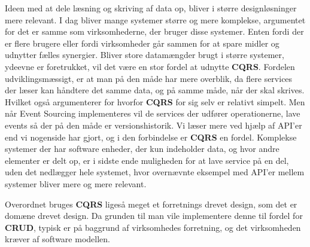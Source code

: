 Ideen med at dele læsning og skriving af data op, bliver i større designløsninger mere relevant. 
I dag bliver mange systemer større og mere komplekse, argumentet for det er samme som virksomhederne, der bruger disse systemer. Enten fordi der er flere brugere eller fordi virksomheder går sammen for at spare midler og udnytter fælles synergier.
Bliver store datamængder brugt i større systemer, ydeevne er foretrukket, vil det være en stor fordel at udnytte \textbf{CQRS}. Fordelen udviklingsmæssigt, er at man på den måde har mere overblik, da flere services der læser kan håndtere det samme data, og på samme måde, når der skal skrives. Hvilket også argumenterer for hvorfor \textbf{CQRS} for sig selv er relativt simpelt. Men når Event Sourcing implementeres vil de services der udfører operationerne, lave events så der på den måde er versionshistorik.
Vi læser mere ved hjælp af API'er end vi nogenside har gjort, og i den forbindelse er \textbf{CQRS} en fordel. Komplekse systemer der har software enheder, der kun indeholder data, og hvor andre elementer er delt op, er i sidste ende muligheden for at lave service på en del, uden det nedlægger hele systemet, hvor overnævnte eksempel med API'er mellem systemer bliver mere og mere relevant. 

Overordnet bruges \textbf{CQRS} ligeså meget et forretnings drevet design, som det er domæne drevet design. Da grunden til man vile implementere denne til fordel for \textbf{CRUD}, typisk er på baggrund af virksomhedes forretning, og det virksomheden kræver af software modellen.